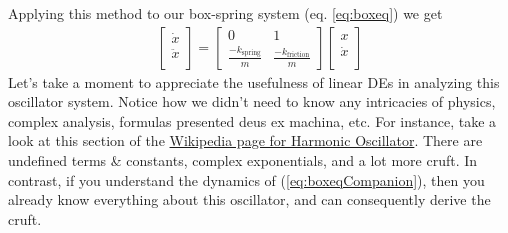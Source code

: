 \documentclass[11pt, oneside]{article}   	%
\begin{document}
Applying this method to our box-spring system (eq. \ref{eq:boxeq}) we get
\begin{align} \label{eq:boxeqCompanion}
\begin{bmatrix}
        \dot{x} \\
        \ddot{x} \\
      \end{bmatrix}
  =
      \begin{bmatrix}
        0 & 1 \\
        \frac{-k_\mathrm{spring}}{m} & \frac{-k_\mathrm{friction}}{m}
      \end{bmatrix}
      \begin{bmatrix}
        x \\
        \dot{x} \\
      \end{bmatrix}
\end{align}
Let's take a moment to appreciate the usefulness of linear DEs in analyzing this oscillator system.
Notice how we didn't need to know any intricacies of physics, complex analysis, formulas presented deus ex machina, etc.
For instance, take a look at this section of the \href{https://en.wikipedia.org/wiki/Harmonic_oscillator#Universal_oscillator_equation}{Wikipedia page for Harmonic Oscillator}.
There are undefined terms \& constants, complex exponentials, and a lot more cruft.
In contrast, if you understand the dynamics of (\ref{eq:boxeqCompanion}),
then you already know everything about this oscillator, and can consequently derive the cruft.
\end{document}
